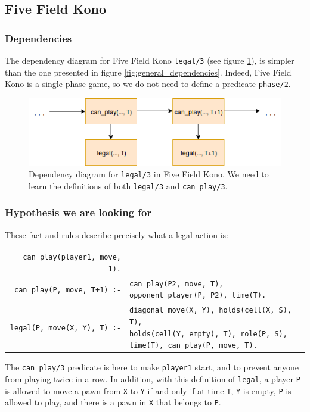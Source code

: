 \subsection{Five Field Kono}

\subsubsection{Dependencies}

The dependency diagram for Five Field Kono \texttt{legal/3} (see figure \ref{fig:FFK_dependencies}), is simpler than the one presented in figure \ref{fig:general_dependencies}. Indeed, Five Field Kono is a single-phase game, so we do not need to define a predicate \texttt{phase/2}.

\begin{figure}[h]
\centering
\includegraphics[width = 0.7\hsize]{figures/FFK_dependancies.png}
\caption{Dependency diagram for \texttt{legal/3} in Five Field Kono. We need to learn the definitions of both \texttt{legal/3} and \texttt{can\_play/3}.}
\label{fig:FFK_dependencies}
\end{figure}

\subsubsection{Hypothesis we are looking for}

These fact and rules describe precisely what a legal action is:\newline
\begin{tabular}{rl}
\texttt{can\_play(player1, move, 1).} & \\
\texttt{can\_play(P, move, T+1) :-} & \makecell[tl]{\texttt{can\_play(P2, move, T),}\\ \texttt{opponent\_player(P, P2), time(T).}} \\
\texttt{legal(P, move(X, Y), T) :-} & \makecell[tl]{\texttt{diagonal\_move(X, Y), holds(cell(X, S), T),} \\ \texttt{holds(cell(Y, empty), T), role(P, S),}\\ \texttt{time(T), can\_play(P, move, T).}}
\end{tabular}

The \texttt{can\_play/3} predicate is here to make \texttt{player1} start, and to prevent anyone from playing twice in a row. In addition, with this definition of \texttt{legal}, a player \texttt{P} is allowed to move a pawn from \texttt{X} to \texttt{Y} if and only if at time \texttt{T}, \texttt{Y} is empty, \texttt{P} is allowed to play, and there is a pawn in \texttt{X} that belongs to \texttt{P}.


